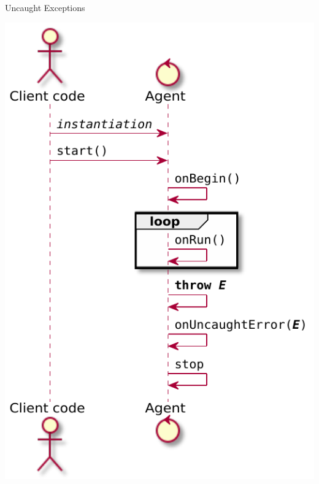 \documentclass[presentation]{beamer}\mode<presentation>{\usetheme{AMSCesenaPurpleAndGold}}
\begin{document}
\begin{frame}[allowframebreaks]{Uncaught Exceptions}
    \begin{center}
    	\includegraphics[height=.8\textheight]{img/exceptional-flow-2.pdf}
    \end{center}


\end{frame}
\end{document}
